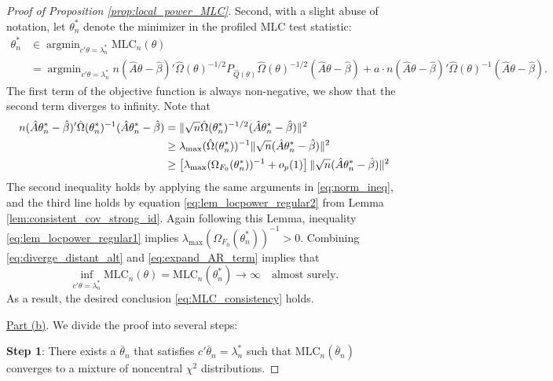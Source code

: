 \documentclass[11pt]{article}
\theoremstyle{definition}
\DeclareMathOperator*{\argmin}{argmin}
\newcommand{\0}{\ensuremath{\mathbf{0}}}
\begin{document}
\begin{bibunit}
\begin{proof}[Proof of Proposition \ref{prop:local_power_MLC}]
    Second, with a slight abuse of notation, let $\theta_n^*$ denote the minimizer in the profiled MLC test statistic:
    \begin{equation}
    \label{eq:minimize_MLC}
    \begin{aligned}
        \theta_n^* 
        &\in \argmin_{c'\theta = \lambda_n^*} \text{MLC}_n(\theta) \\
        & = \argmin_{c'\theta = \lambda_n^*} n(\hat{A}\theta - \hat{\beta})' \hat{\Omega}(\theta)^{-1/2} P_{\hat{Q}(\theta)} \hat{\Omega}(\theta)^{-1/2} (\hat{A}\theta - \hat{\beta}) + a\cdot n(\hat{A}\theta - \hat{\beta})'\hat{\Omega}(\theta)^{-1}(\hat{A}\theta - \hat{\beta}).
    \end{aligned}
    \end{equation}
    The first term of the objective function is always non-negative, we show that the second term diverges to infinity. Note that
    \begin{align}
    n(\hat{A}\theta_{n}^* - \hat{\beta})'\hat{\Omega}(\theta_{n}^*)^{-1}(\hat{A}\theta_{n}^* - \hat{\beta}) 
    &= \|\sqrt{n}\hat{\Omega}(\theta_n^*)^{-1/2}(\hat{A}\theta_n^* - \hat{\beta})\|^2  \notag \\
    &\geq \lambda_{\max}(\hat{\Omega}(\theta_n^*))^{-1} \|\sqrt{n}(\hat{A}\theta_n^* - \hat{\beta})\|^2  \notag \\ 
    &\geq \left[\lambda_{\max}(\Omega_{F_0}(\theta_n^*))^{-1} + o_p(1)\right] \|\sqrt{n}(\hat{A}\theta_n^* - \hat{\beta})\|^2 \label{eq:expand_AR_term}
    \end{align}
    The second inequality holds by applying the same arguments in \eqref{eq:norm_ineq}, and the third line holds by equation \eqref{eq:lem_locpower_regular2} from Lemma \ref{lem:consistent_cov_strong_id}. Again following this Lemma, inequality \eqref{eq:lem_locpower_regular1} implies $\lambda_{\max}(\Omega_{F_0}(\theta_n^*))^{-1} > 0$. Combining \eqref{eq:diverge_distant_alt} and \eqref{eq:expand_AR_term} implies that 
    \[
        \inf_{c'\theta = \lambda_n^*} \text{MLC}_n(\theta) = \text{MLC}_n(\theta_n^*) \to \infty \quad \text{almost surely}.
    \]
     As a result, the desired conclusion \eqref{eq:MLC_consistency} holds.

    \underline{Part (b)}. We divide the proof into several steps:
    
    \textbf{Step 1}: There exists a $\bar{\theta}_n$ that satisfies $c'\bar{\theta}_n = \lambda_n^*$ such that $\text{MLC}_n(\bar{\theta}_n)$ converges to a mixture of noncentral $\chi^2$ distributions.


\end{proof}
\end{bibunit}
\end{document}
